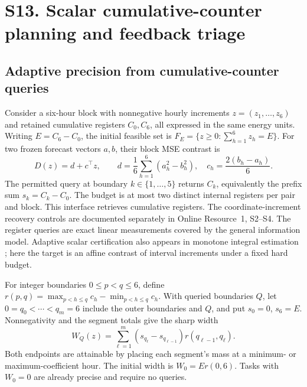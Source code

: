 \section{S13. Scalar cumulative-counter planning and feedback triage}
\subsection{Adaptive precision from cumulative-counter queries}
\label{sec:counter-precision-method}
Consider a six-hour block with nonnegative hourly increments
$z=(z_1,\ldots,z_6)$ and retained cumulative registers $C_0,C_6$,
all expressed in the same energy units.
Writing $E=C_6-C_0$, the initial feasible set is
$F_E=\{z\geq0:\sum_{h=1}^6z_h=E\}$.
For two frozen forecast vectors $a,b$, their block MSE contrast is
\[
 D(z)=d+c^\top z,\qquad
 d=\frac16\sum_{h=1}^6(a_h^2-b_h^2),\quad
 c_h=\frac{2(b_h-a_h)}6.
\]
The permitted query at boundary $k\in\{1,\ldots,5\}$ returns
$C_k$, equivalently the prefix sum $s_k=C_k-C_0$.
The budget is at most two distinct internal registers per pair and block.
This interface retrieves cumulative registers. The coordinate-increment
recovery controls are documented separately in Online Resource~1, S2--S4.
The register queries are exact linear measurements covered by the general
information model. Adaptive scalar certification also appears in monotone
integral estimation \citep[Section~4.1]{gaillard2023}; here the target is an
affine contrast of interval increments under a fixed hard budget.

For integer boundaries $0\leq p<q\leq6$, define
$r(p,q)=\max_{p<h\leq q}c_h-\min_{p<h\leq q}c_h$.
With queried boundaries $Q$, let $0=q_0<\cdots<q_m=6$ include
the outer boundaries and $Q$, and put $s_0=0$, $s_6=E$.
Nonnegativity and the segment totals give the sharp width
\begin{equation}
 W_Q(z)=\sum_{\ell=1}^{m}
 (s_{q_\ell}-s_{q_{\ell-1}})r(q_{\ell-1},q_\ell).
 \label{eq:counter-width}
\end{equation}
Both endpoints are attainable by placing each segment's mass at a
minimum- or maximum-coefficient hour. The initial width is $W_0=Er(0,6)$.
Tasks with $W_0=0$ are already precise and require no queries.


